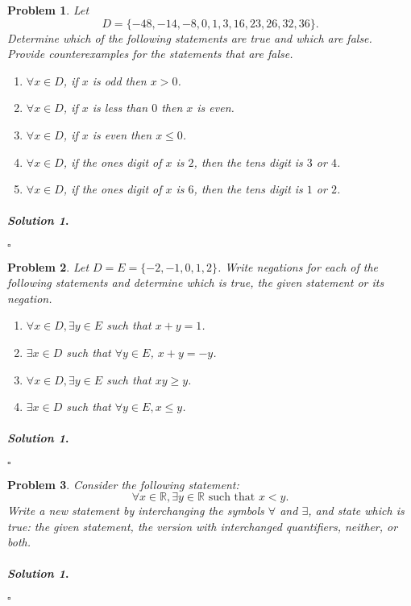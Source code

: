 \documentclass{amsart}
\theoremstyle{plain}
\newtheorem{problem}{Problem}
\newenvironment{solution}{\paragraph{\emph{Solution 1}.}}{\hfill$\square$}
\begin{document}
\begin{problem}
Let 
$$D = \{-48,-14,-8,0,1,3,16,23,26,32,36 \}. $$
Determine which of the following statements are true and which are false.  Provide counterexamples for the statements that are false.
\begin{enumerate}
\item $\forall x \in D$, if $x$ is odd then $x > 0$.
\item $\forall x \in D$, if $x$ is less than $0$ then $x$ is even.
\item $\forall x \in D$, if $x$ is even then $x \le 0$.
\item $\forall x \in D$, if the ones digit of $x$ is $2$, then the tens digit is $3$ or $4$.
\item $\forall x \in D$, if the ones digit of $x$ is $6$, then the tens digit is $1$ or $2$.
\end{enumerate}
\end{problem}
\begin{solution}
\end{solution}

\begin{problem}
Let $D = E = \{-2,-1,0,1,2 \}$.  Write negations for each of the following statements and determine which is true, the given statement or its negation.
\begin{enumerate}
\item $\forall x \in D, \exists y \in E$ such that $x + y = 1$.
\item $\exists x \in D$ such that $\forall y \in E$, $x+y = -y$.
\item $\forall x \in D, \exists y \in E$ such that $xy \ge y$.
\item $\exists x \in D$ such that $\forall y \in E, x \le y$.
\end{enumerate}
\end{problem}
\begin{solution}
\end{solution}

\begin{problem}
Consider the following statement:
$$\forall x \in \mathbb{R}, \exists y \in \mathbb{R} \text{ such that } x < y. $$
Write a new statement by interchanging the symbols $\forall$ and $\exists$, and state which is true:  the given statement, the version with interchanged quantifiers, neither, or both.
\end{problem}
\begin{solution}
\end{solution}
\end{document}
